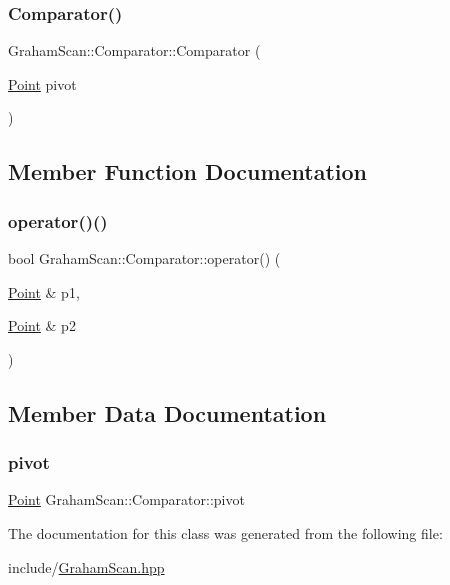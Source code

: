 \subsubsection{\texorpdfstring{Comparator()}{Comparator()}}
{\footnotesize\ttfamily Graham\+Scan\+::\+Comparator\+::\+Comparator (\begin{DoxyParamCaption}\item[{\mbox{\hyperlink{classPoint}{Point}}}]{pivot }\end{DoxyParamCaption})\hspace{0.3cm}{\ttfamily [inline]}}



\subsection{Member Function Documentation}
\mbox{\label{classGrahamScan_1_1Comparator_a53344fb7ac1cf932b7e348c0a729d9dc}} 
\subsubsection{\texorpdfstring{operator()()}{operator()()}}
{\footnotesize\ttfamily bool Graham\+Scan\+::\+Comparator\+::operator() (\begin{DoxyParamCaption}\item[{\mbox{\hyperlink{classPoint}{Point}} \&}]{p1,  }\item[{\mbox{\hyperlink{classPoint}{Point}} \&}]{p2 }\end{DoxyParamCaption})\hspace{0.3cm}{\ttfamily [inline]}}



\subsection{Member Data Documentation}
\mbox{\label{classGrahamScan_1_1Comparator_ab63927ef091a22dee8e29d8b27f8f7c3}} 
\subsubsection{\texorpdfstring{pivot}{pivot}}
{\footnotesize\ttfamily \mbox{\hyperlink{classPoint}{Point}} Graham\+Scan\+::\+Comparator\+::pivot\hspace{0.3cm}{\ttfamily [private]}}



The documentation for this class was generated from the following file\+:\begin{DoxyCompactItemize}
\item 
include/\mbox{\hyperlink{GrahamScan_8hpp}{Graham\+Scan.\+hpp}}\end{DoxyCompactItemize}
